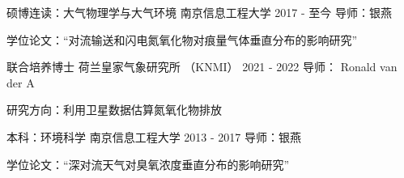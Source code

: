 

\begin{cventries}

  \cventry
    {硕博连读：大气物理学与大气环境} %
    {南京信息工程大学} %
    {2017 - 至今} %
    {导师：银燕} %
    {
      \begin{cvitems} %
        \item {学位论文：“对流输送和闪电氮氧化物对痕量气体垂直分布的影响研究”}
      \end{cvitems}
    }

  \cventry
    {联合培养博士} %
    {荷兰皇家气象研究所 （KNMI）} %
    {2021 - 2022} %
    {导师： Ronald van der A} %
    {
      \begin{cvitems} %
        \item {研究方向：利用卫星数据估算氮氧化物排放}
      \end{cvitems}
    }

  \cventry
    {本科：环境科学} %
    {南京信息工程大学} %
    {2013 - 2017} %
    {导师：银燕} %
    {
      \begin{cvitems} %
        \item {学位论文：“深对流天气对臭氧浓度垂直分布的影响研究”}
      \end{cvitems}
    }


\end{cventries}
